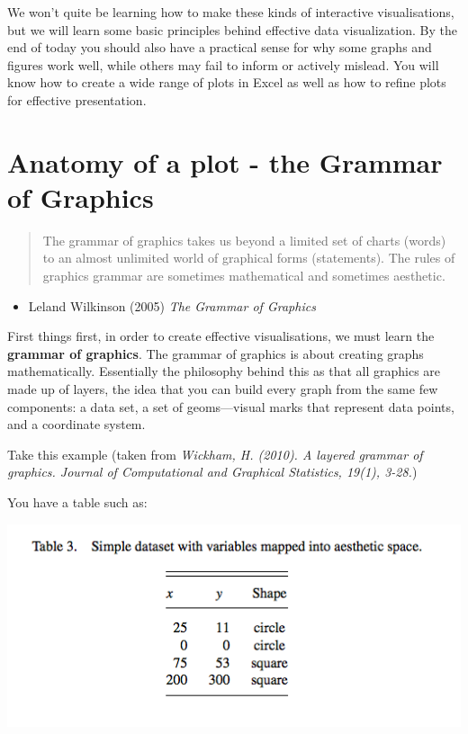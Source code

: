 \documentclass[
]{book}
\providecommand{\tightlist}{%
  \setlength{\itemsep}{0pt}\setlength{\parskip}{0pt}}
\begin{document}
We won't quite be learning how to make these kinds of interactive visualisations, but we will learn some basic principles behind effective data visualization. By the end of today you should also have a practical sense for why some graphs and figures work well, while others may fail to inform or actively mislead. You will know how to create a wide range of plots in Excel as well as how to refine plots for effective presentation.

\hypertarget{anatomy-of-a-plot---the-grammar-of-graphics}{%
\section{Anatomy of a plot - the Grammar of Graphics}\label{anatomy-of-a-plot---the-grammar-of-graphics}}

\begin{quote}
The grammar of graphics takes us beyond a limited set
of charts (words) to an almost unlimited world of graphical forms (statements).
The rules of graphics grammar are sometimes mathematical and
sometimes aesthetic.
\end{quote}

\begin{itemize}
\tightlist
\item
  Leland Wilkinson (2005) \emph{The Grammar of Graphics}
\end{itemize}

First things first, in order to create effective visualisations, we must learn the \textbf{grammar of graphics}. The grammar of graphics is about creating graphs mathematically. Essentially the philosophy behind this as that all graphics are made up of layers, the idea that you can build every graph from the same few components: a data set, a set of geoms---visual marks that represent data points, and a coordinate system.

Take this example (taken from \emph{Wickham, H. (2010). A layered grammar of graphics. Journal of Computational and Graphical Statistics, 19(1), 3-28.})

You have a table such as:

\includegraphics{imgs/table.png}
\end{document}
